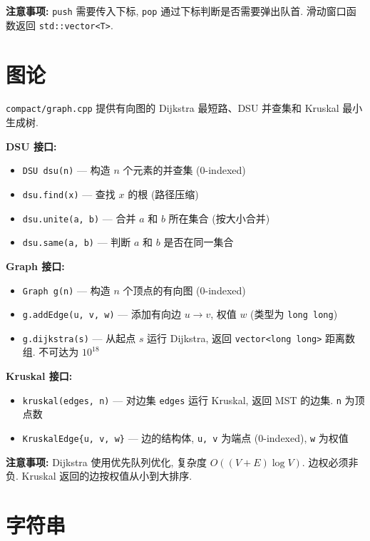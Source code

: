 \documentclass[a4paper]{ctexbook}
\begin{document}
\textbf{注意事项:} \texttt{push} 需要传入下标, \texttt{pop} 通过下标判断是否需要弹出队首. 滑动窗口函数返回 \texttt{std::vector<T>}.



\section{图论}

\texttt{compact/graph.cpp} 提供有向图的 Dijkstra 最短路、DSU 并查集和 Kruskal 最小生成树.

\textbf{DSU 接口:}
\begin{itemize}
	\item \texttt{DSU dsu(n)} — 构造 $n$ 个元素的并查集 (0-indexed)
	\item \texttt{dsu.find(x)} — 查找 $x$ 的根 (路径压缩)
	\item \texttt{dsu.unite(a, b)} — 合并 $a$ 和 $b$ 所在集合 (按大小合并)
	\item \texttt{dsu.same(a, b)} — 判断 $a$ 和 $b$ 是否在同一集合
\end{itemize}

\textbf{Graph 接口:}
\begin{itemize}
	\item \texttt{Graph g(n)} — 构造 $n$ 个顶点的有向图 (0-indexed)
	\item \texttt{g.addEdge(u, v, w)} — 添加有向边 $u \to v$, 权值 $w$ (类型为 \texttt{long long})
	\item \texttt{g.dijkstra(s)} — 从起点 $s$ 运行 Dijkstra, 返回 \texttt{vector<long long>} 距离数组. 不可达为 $10^{18}$
\end{itemize}

\textbf{Kruskal 接口:}
\begin{itemize}
	\item \texttt{kruskal(edges, n)} — 对边集 \texttt{edges} 运行 Kruskal, 返回 MST 的边集. \texttt{n} 为顶点数
	\item \texttt{KruskalEdge\{u, v, w\}} — 边的结构体, \texttt{u, v} 为端点 (0-indexed), \texttt{w} 为权值
\end{itemize}

\textbf{注意事项:} Dijkstra 使用优先队列优化, 复杂度 $O((V+E) \log V)$. 边权必须非负. Kruskal 返回的边按权值从小到大排序.



\section{字符串}
\end{document}
